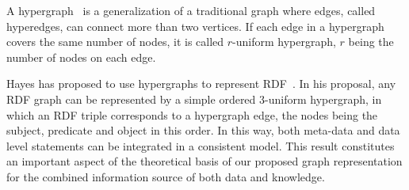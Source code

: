 A hypergraph~\cite{Hypergraph} is a generalization of a traditional graph where edges, called hyperedges, can connect more than two vertices. If each edge in a hypergraph covers the same number of nodes, it is called $r$-uniform hypergraph, $r$ being the number of nodes on each edge.

Hayes has proposed to use hypergraphs to represent RDF~\cite{GraphModelRDF}. In his proposal, any RDF graph can be represented by a simple ordered 3-uniform hypergraph, in which an RDF triple corresponds to a hypergraph edge, the nodes being the subject, predicate and object in this order. In this way, both meta-data and data level statements can be integrated in a consistent model.
This result constitutes an important aspect of the theoretical basis of our proposed graph representation for the combined information source of both data and knowledge.

